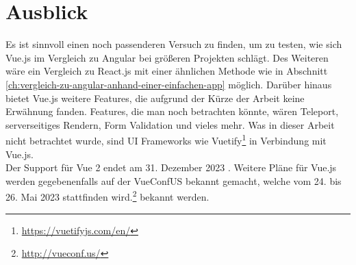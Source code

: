 

\chapter{Ausblick}
Es ist sinnvoll einen noch passenderen Versuch zu finden, um zu testen,
wie sich Vue.js im Vergleich zu Angular bei größeren Projekten schlägt.
Des Weiteren wäre ein Vergleich zu React.js mit einer ähnlichen Methode wie in Abschnitt \ref{ch:vergleich-zu-angular-anhand-einer-einfachen-app} möglich.
Darüber hinaus bietet Vue.js weitere Features, die aufgrund der Kürze der Arbeit keine Erwähnung fanden.
Features, die man noch betrachten könnte, wären Teleport, serverseitiges Rendern, Form Validation und vieles mehr.
Was in dieser Arbeit nicht betrachtet wurde, sind UI Frameworks wie Vuetify\footnote{\url{https://vuetifyjs.com/en/}} in Verbindung mit Vue.js.
\\
Der Support für Vue 2 endet am 31. Dezember 2023 \cite{vueFAQ}.
Weitere Pläne für Vue.js werden gegebenenfalls auf der VueConfUS bekannt gemacht, welche vom 24. bis 26. Mai 2023 stattfinden wird.\footnote{\url{http://vueconf.us/}} bekannt werden.